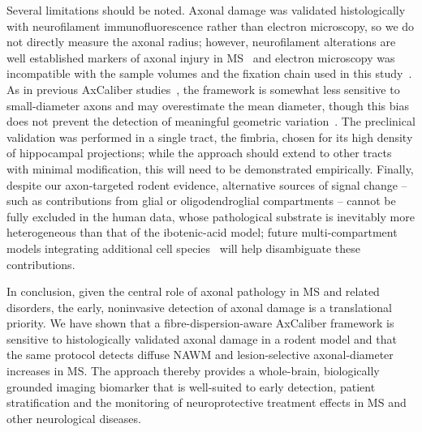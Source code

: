 \documentclass[11pt]{article}
\begin{document}
Several limitations should be noted. Axonal damage was validated histologically with neurofilament immunofluorescence rather than electron microscopy, so we do not directly measure the axonal radius; however, neurofilament alterations are well established markers of axonal injury in MS~\cite{petzold2005neurofilament} and electron microscopy was incompatible with the sample volumes and the fixation chain used in this study~\cite{horowitz2015axon}. As in previous AxCaliber studies~\cite{assaf2008axcaliber}, the framework is somewhat less sensitive to small-diameter axons and may overestimate the mean diameter, though this bias does not prevent the detection of meaningful geometric variation~\cite{horowitz2015axon}. The preclinical validation was performed in a single tract, the fimbria, chosen for its high density of hippocampal projections; while the approach should extend to other tracts with minimal modification, this will need to be demonstrated empirically. Finally, despite our axon-targeted rodent evidence, alternative sources of signal change -- such as contributions from glial or oligodendroglial compartments -- cannot be fully excluded in the human data, whose pathological substrate is inevitably more heterogeneous than that of the ibotenic-acid model; future multi-compartment models integrating additional cell species~\cite{ercan2015multimodal} will help disambiguate these contributions.

In conclusion, given the central role of axonal pathology in MS and related disorders, the early, noninvasive detection of axonal damage is a translational priority. We have shown that a fibre-dispersion-aware AxCaliber framework is sensitive to histologically validated axonal damage in a rodent model and that the same protocol detects diffuse NAWM and lesion-selective axonal-diameter increases in MS. The approach thereby provides a whole-brain, biologically grounded imaging biomarker that is well-suited to early detection, patient stratification and the monitoring of neuroprotective treatment effects in MS and other neurological diseases.



\end{document}
